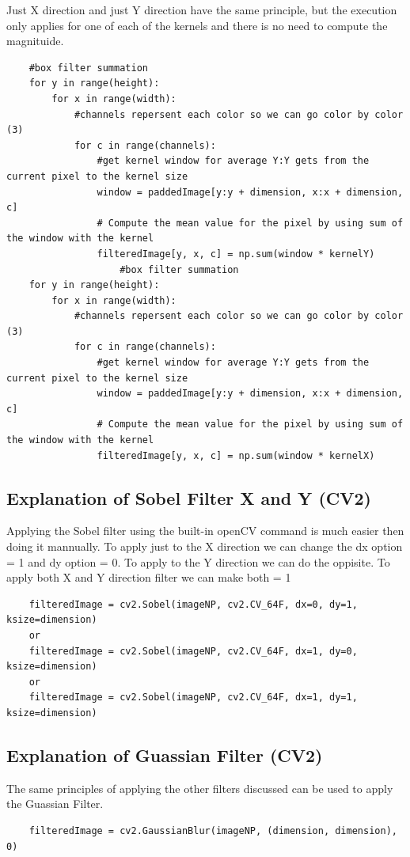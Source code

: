 Just X direction and just Y direction have the same principle, but the execution only applies for one of each of the kernels and there is no need to compute the magnituide.
\begin{verbatim}
    #box filter summation
    for y in range(height):
        for x in range(width):
            #channels repersent each color so we can go color by color (3)
            for c in range(channels):
                #get kernel window for average Y:Y gets from the current pixel to the kernel size
                window = paddedImage[y:y + dimension, x:x + dimension, c]
                # Compute the mean value for the pixel by using sum of the window with the kernel
                filteredImage[y, x, c] = np.sum(window * kernelY)
                    #box filter summation
    for y in range(height):
        for x in range(width):
            #channels repersent each color so we can go color by color (3)
            for c in range(channels):
                #get kernel window for average Y:Y gets from the current pixel to the kernel size
                window = paddedImage[y:y + dimension, x:x + dimension, c]
                # Compute the mean value for the pixel by using sum of the window with the kernel
                filteredImage[y, x, c] = np.sum(window * kernelX)
\end{verbatim}
\subsection{Explanation of Sobel Filter X and Y (CV2)}
Applying the Sobel filter using the built-in openCV command is much easier then doing it mannually. To apply just to the X direction we can change the dx option = 1 and dy option = 0. To apply to the Y direction we can do the oppisite. To apply both X and Y direction filter we can make both = 1
\begin{verbatim}
    filteredImage = cv2.Sobel(imageNP, cv2.CV_64F, dx=0, dy=1, ksize=dimension)
    or
    filteredImage = cv2.Sobel(imageNP, cv2.CV_64F, dx=1, dy=0, ksize=dimension)
    or
    filteredImage = cv2.Sobel(imageNP, cv2.CV_64F, dx=1, dy=1, ksize=dimension)
\end{verbatim}
\subsection{Explanation of Guassian Filter (CV2)}
The same principles of applying the other filters discussed can be used to apply the Guassian Filter.
\begin{verbatim}
    filteredImage = cv2.GaussianBlur(imageNP, (dimension, dimension), 0)
\end{verbatim}
